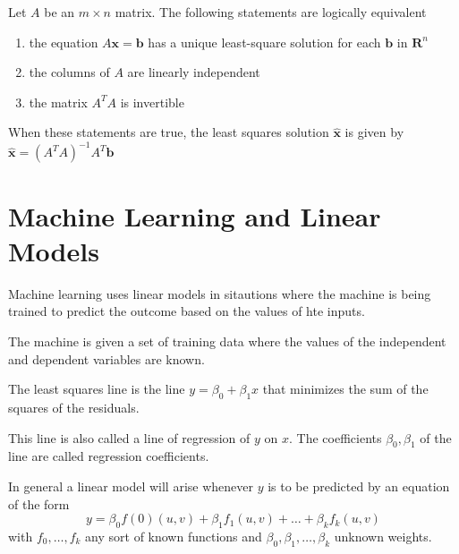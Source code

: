 \documentclass[../linalg.tex]{subfiles}
\begin{document}
\begin{theorem}
    Let $A$ be an $m\times n$ matrix. The following statements are logically equivalent 
    \begin{enumerate}
        \item the equation $A\textbf{x}=\textbf{b}$ has a unique least-square solution for each $\textbf{b}$ in $\textbf{R}^n$
        \item the columns of $A$ are linearly independent
        \item the matrix $A^TA$ is invertible 
    \end{enumerate}
    When these statements are true, the least squares solution $\hat{\textbf{x}}$ is given by $\hat{\textbf{x}}=(A^TA)^{-1}A^T\textbf{b}$
\end{theorem}

\section{Machine Learning and Linear Models}
Machine learning uses linear models in sitautions where the machine is being trained to predict the outcome based on the values of hte inputs.

The machine is given a set of training data where the values of the independent and dependent variables are known.

The least squares line is the line $y=\beta_0+\beta_1 x$ that minimizes the sum of the squares of the residuals.

This line is also called a line of regression of $y$ on $x$. The coefficients $\beta_0,\beta_1$ of the line are called regression coefficients.

In general a linear model will arise whenever $y$ is to be predicted by an equation of the form 
\[ y=\beta_0f(0)(u,v)+\beta_1f_1(u,v)+\dots+\beta_k f_k(u,v) \]
with $f_0,\dots,f_k$ any sort of known functions and $\beta_0,\beta_1,\dots,\beta_k$ unknown weights.
\end{document}
